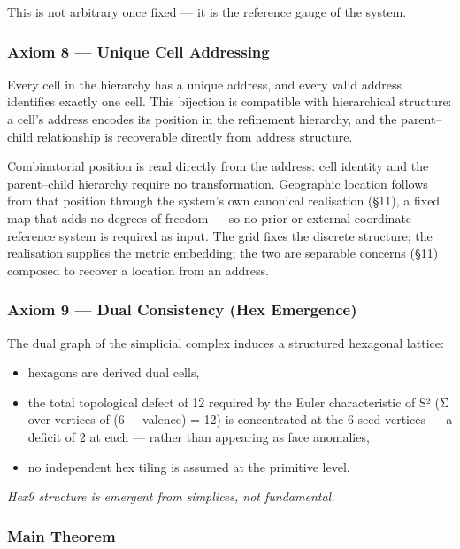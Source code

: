 \documentclass[
  11pt,
  a4paper,
]{article}
\providecommand{\tightlist}{%
  \setlength{\itemsep}{0pt}\setlength{\parskip}{0pt}}
\begin{document}
This is not arbitrary once fixed --- it is the reference gauge of the
system.

\subsubsection{Axiom 8 --- Unique Cell
Addressing}\label{axiom-8-unique-cell-addressing}

Every cell in the hierarchy has a unique address, and every valid
address identifies exactly one cell. This bijection is compatible with
hierarchical structure: a cell's address encodes its position in the
refinement hierarchy, and the parent--child relationship is recoverable
directly from address structure.

Combinatorial position is read directly from the address: cell identity
and the parent--child hierarchy require no transformation. Geographic
location follows from that position through the system's own canonical
realisation (§11), a fixed map that adds no degrees of freedom --- so no
prior or external coordinate reference system is required as input. The
grid fixes the discrete structure; the realisation supplies the metric
embedding; the two are separable concerns (§11) composed to recover a
location from an address.

\subsubsection{Axiom 9 --- Dual Consistency (Hex
Emergence)}\label{axiom-9-dual-consistency-hex-emergence}

The dual graph of the simplicial complex induces a structured hexagonal
lattice:

\begin{itemize}
\tightlist
\item
  hexagons are derived dual cells,
\item
  the total topological defect of 12 required by the Euler
  characteristic of S² (Σ over vertices of (6 − valence) = 12) is
  concentrated at the 6 seed vertices --- a deficit of 2 at each ---
  rather than appearing as face anomalies,
\item
  no independent hex tiling is assumed at the primitive level.
\end{itemize}

\emph{Hex9 structure is emergent from simplices, not fundamental.}

\subsubsection{Main Theorem}\label{main-theorem}
\end{document}
